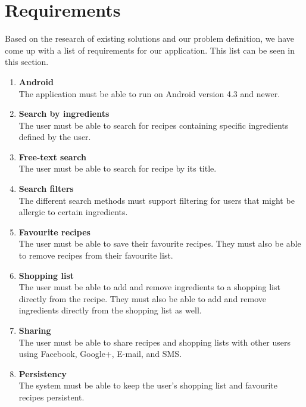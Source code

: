 \section{Requirements}\label{sec:requirement}

Based on the research of existing solutions and our problem definition, we have come up with a list of requirements for our application. This list can be seen in this section.

\begin{enumerate}
  \item\label{req:android} \textbf{Android} \\
    The application must be able to run on Android version 4.3 and newer.
    
  \item\label{req:ingredientsearch} \textbf{Search by ingredients} \\
    The user must be able to search for recipes containing specific ingredients defined by the user.
    
  \item\label{req:recipesearch} \textbf{Free-text search} \\
    The user must be able to search for recipe by its title.
    
  \item\label{req:searchfilters} \textbf{Search filters} \\
    The different search methods must support filtering for users that might be allergic to certain ingredients.
    
  \item\label{req:favourite} \textbf{Favourite recipes} \\
    The user must be able to save their favourite recipes. They must also be able to remove recipes from their favourite list.
    
  \item\label{req:shoppinglist} \textbf{Shopping list} \\
    The user must be able to add and remove ingredients to a shopping list directly from the recipe. They must also be able to add and remove ingredients directly from the shopping list as well.
    
  \item\label{req:sharing} \textbf{Sharing} \\
    The user must be able to share recipes and shopping lists with other users using Facebook, Google+, E-mail, and SMS.
    
  \item\label{req:persistency} \textbf{Persistency} \\
    The system must be able to keep the user's shopping list and favourite recipes persistent.
    

\end{enumerate}

